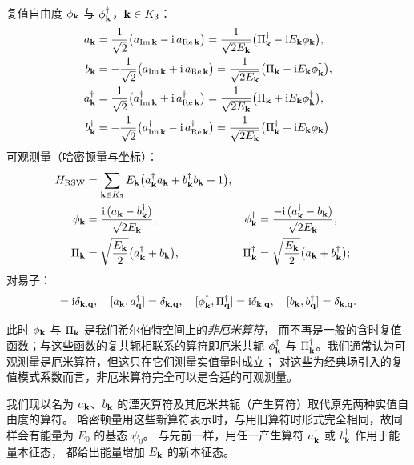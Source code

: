 \begin{keybox}
复值自由度 $\phi_{\mathbf{k}}$ 与 $\phi^{\dagger}_{\mathbf{k}}$，$\mathbf{k}\in K_{3}$：
\begin{align*}
a_{\mathbf{k}}&=\frac{1}{\sqrt2}\bigl(a_{\operatorname{Im}\mathbf{k}}-\mathrm{i}\,a_{\operatorname{Re}\mathbf{k}}\bigr)
=\frac{1}{\sqrt{2E_{\mathbf{k}}}}\bigl(\Pi^{\dagger}_{\mathbf{k}}-\mathrm{i} E_{\mathbf{k}}\phi_{\mathbf{k}}\bigr),\\
b_{\mathbf{k}}&=-\frac{1}{\sqrt2}\bigl(a_{\operatorname{Im}\mathbf{k}}+\mathrm{i}\,a_{\operatorname{Re}\mathbf{k}}\bigr)
=\frac{1}{\sqrt{2E_{\mathbf{k}}}}\bigl(\Pi_{\mathbf{k}}-\mathrm{i} E_{\mathbf{k}}\phi^{\dagger}_{\mathbf{k}}\bigr),\\
a^{\dagger}_{\mathbf{k}}&=\frac{1}{\sqrt2}\bigl(a^{\dagger}_{\operatorname{Im}\mathbf{k}}+\mathrm{i}\,a^{\dagger}_{\operatorname{Re}\mathbf{k}}\bigr)
=\frac{1}{\sqrt{2E_{\mathbf{k}}}}\bigl(\Pi_{\mathbf{k}}+\mathrm{i} E_{\mathbf{k}}\phi^{\dagger}_{\mathbf{k}}\bigr),\\
b^{\dagger}_{\mathbf{k}}&=-\frac{1}{\sqrt2}\bigl(a^{\dagger}_{\operatorname{Im}\mathbf{k}}-\mathrm{i}\,a^{\dagger}_{\operatorname{Re}\mathbf{k}}\bigr)
=\frac{1}{\sqrt{2E_{\mathbf{k}}}}\bigl(\Pi^{\dagger}_{\mathbf{k}}+\mathrm{i} E_{\mathbf{k}}\phi_{\mathbf{k}}\bigr)
\end{align*}
可观测量（哈密顿量与坐标）：
\begin{align*}
H_{\text{RSW}}&=\sum_{\mathbf{k}\in K_{3}}E_{\mathbf{k}}
\bigl(a^{\dagger}_{\mathbf{k}}a_{\mathbf{k}}+b^{\dagger}_{\mathbf{k}}b_{\mathbf{k}}+1\bigr),\\
\phi_{\mathbf{k}}&=\frac{\mathrm{i}\,(a_{\mathbf{k}}-b^{\dagger}_{\mathbf{k}})}{\sqrt{2E_{\mathbf{k}}}},&
\phi^{\dagger}_{\mathbf{k}}&=\frac{-\mathrm{i}\,(a^{\dagger}_{\mathbf{k}}-b_{\mathbf{k}})}{\sqrt{2E_{\mathbf{k}}}},\\
\Pi_{\mathbf{k}}&=\sqrt{\frac{E_{\mathbf{k}}}{2}}\bigl(a^{\dagger}_{\mathbf{k}}+b_{\mathbf{k}}\bigr),&
\Pi^{\dagger}_{\mathbf{k}}&=\sqrt{\frac{E_{\mathbf{k}}}{2}}\bigl(a_{\mathbf{k}}+b^{\dagger}_{\mathbf{k}}\bigr);
\end{align*}
对易子：
\begin{equation*}
[\phi_{\bk},\Pi_{\bq}]=\ii\delta_{\bk,\bq},\quad
[a_{\bk},a^{\dagger}_{\bq}]=\delta_{\bk,\bq},\quad
[\phi^{\dagger}_{\bk},\Pi^{\dagger}_{\bq}]=\ii\delta_{\bk,\bq},\quad
[b_{\bk},b^{\dagger}_{\bq}]=\delta_{\bk,\bq}.
\end{equation*}
\end{keybox}

此时 $\phi_{\mathbf{k}}$ 与 $\Pi_{\mathbf{k}}$ 是我们希尔伯特空间上的\emph{非厄米算符}，
而不再是一般的含时复值函数；与这些函数的复共轭相联系的算符即厄米共轭 $\phi^{\dagger}_{\mathbf{k}}$
与 $\Pi^{\dagger}_{\mathbf{k}}$。我们通常认为可观测量是厄米算符，但这只在它们测量实值量时成立；
对这些为经典场引入的复值模式系数而言，非厄米算符完全可以是合适的可观测量。

我们现以名为 $a_{\mathbf{k}}$、$b_{\mathbf{k}}$ 的湮灭算符及其厄米共轭（产生算符）取代原先两种实值自由度的算符。
哈密顿量用这些新算符表示时，与用旧算符时形式完全相同，故同样会有能量为 $E_{0}$ 的基态 $\psi_{0}$。
与先前一样，用任一产生算符 $a^{\dagger}_{\mathbf{k}}$ 或 $b^{\dagger}_{\mathbf{k}}$ 作用于能量本征态，
都给出能量增加 $E_{\mathbf{k}}$ 的新本征态。


